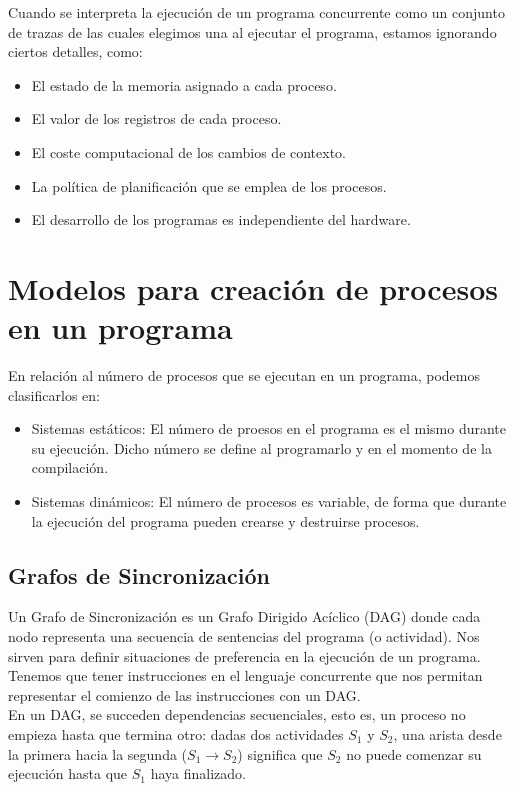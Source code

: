 \noindent
Cuando se interpreta la ejecución de un programa concurrente como un conjunto de trazas de las cuales elegimos una al ejecutar el programa, estamos ignorando ciertos detalles, como:
\begin{itemize}
    \item El estado de la memoria asignado a cada proceso.
    \item El valor de los registros de cada proceso.
    \item El coste computacional de los cambios de contexto.
    \item La política de planificación que se emplea de los procesos.
    \item El desarrollo de los programas es independiente del hardware.
\end{itemize}

\section{Modelos para creación de procesos en un programa}
En relación al número de procesos que se ejecutan en un programa, podemos clasificarlos en:
\begin{itemize}
    \item Sistemas estáticos: El número de proesos en el programa es el mismo durante su ejecución. Dicho número se define al programarlo y en el momento de la compilación.
    \item Sistemas dinámicos: El número de procesos es variable, de forma que durante la ejecución del programa pueden crearse y destruirse procesos.
\end{itemize}

\subsection{Grafos de Sincronización}
Un Grafo de Sincronización es un Grafo Dirigido Acíclico (DAG) donde cada nodo representa una secuencia de sentencias del programa (o actividad). Nos sirven para definir situaciones de preferencia en la ejecución de un programa. Tenemos que tener instrucciones en el lenguaje concurrente que nos permitan representar el comienzo de las instrucciones con un DAG\@.\\

En un DAG, se succeden dependencias secuenciales, esto es, un proceso no empieza hasta que termina otro: dadas dos actividades $S_1$ y $S_2$, una arista desde la primera hacia la segunda ($S_1\rightarrow S_2$) significa que $S_2$ no puede comenzar su ejecución hasta que $S_1$ haya finalizado.\\

